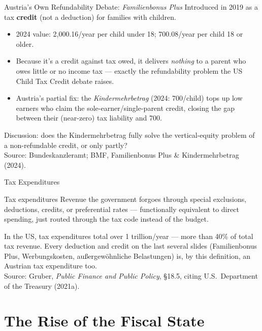\documentclass[11pt,aspectratio=169]{beamer}
\newcommand{\srcnote}[1]{{\footnotesize\color{wugray}Source: #1}}
\begin{document}
\begin{frame}{Austria's Own Refundability Debate: \emph{Familienbonus Plus}}
  \footnotesize
  Introduced in 2019 as a tax \textbf{credit} (not a deduction) for families with children.
  \begin{itemize}
    \item 2024 value: \texteuro{}2{,}000.16/year per child under 18; \texteuro{}700.08/year per child 18 or older.
    \item Because it's a credit against tax owed, it delivers \emph{nothing} to a parent who owes little or no income tax --- exactly the refundability problem the US Child Tax Credit debate raises.
    \item Austria's partial fix: the \emph{Kindermehrbetrag} (2024: \texteuro{}700/child) tops up low earners who claim the sole-earner/single-parent credit, closing the gap between their (near-zero) tax liability and \texteuro{}700.
  \end{itemize}
  \vspace{0.3em}
  \centering
  \alert{Discussion:} does the Kindermehrbetrag fully solve the vertical-equity problem of a non-refundable credit, or only partly?\\
  \srcnote{Bundeskanzleramt; BMF, Familienbonus Plus \& Kindermehrbetrag (2024).}
\end{frame}

\begin{frame}{Tax Expenditures}
  \begin{block}{Tax expenditures}
    Revenue the government forgoes through special exclusions, deductions, credits, or preferential rates --- functionally equivalent to direct spending, just routed through the tax code instead of the budget.
  \end{block}
  \vspace{0.3em}
  \centering
  In the US, tax expenditures total over \texteuro{}1 trillion/year --- more than 40\% of total tax revenue. Every deduction and credit on the last several slides (Familienbonus Plus, Werbungskosten, außergewöhnliche Belastungen) is, by this definition, an Austrian tax expenditure too.\\
  \srcnote{Gruber, \emph{Public Finance and Public Policy}, \S18.5, citing U.S.\ Department of the Treasury (2021a).}
\end{frame}

\section{The Rise of the Fiscal State}
\end{document}
